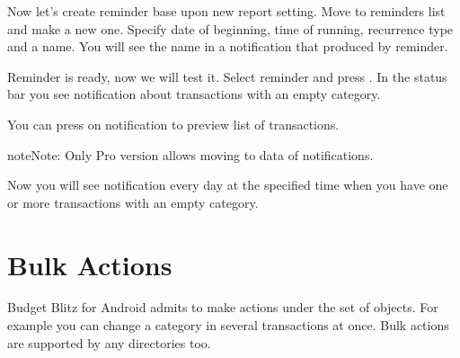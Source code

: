 \documentclass[a4paper,10pt,english]{sphinxmanual}
\begin{document}
\noindent{}

\sphinxAtStartPar
Now let’s create reminder base upon new report setting. Move to reminders list and make a new one.
Specify date of beginning, time of running, recurrence type and a name. You will see the name
in a notification that produced by reminder.

\noindent{}

\noindent{}

\noindent{}

\sphinxAtStartPar
Reminder is ready, now we will test it. Select reminder and press .
In the status bar you see notification about transactions with an empty category.

\noindent{}

\noindent{}

\noindent{}

\sphinxAtStartPar
You can press on notification to preview list of transactions.

\begin{sphinxadmonition}{note}{Note:}
\sphinxAtStartPar
Only Pro version allows moving to data of notifications.
\end{sphinxadmonition}

\sphinxAtStartPar
Now you will see notification every day at the specified time when
you have one or more transactions with an empty category.

\sphinxstepscope


\chapter{Bulk Actions}
\label{\detokenize{bulk-actions:bulk-actions}}\label{\detokenize{bulk-actions:chapter-bulk-actions}}\label{\detokenize{bulk-actions::doc}}
\sphinxAtStartPar
Budget Blitz for Android admits to make actions under the set of objects. For example you can change a category
in several transactions at once. Bulk actions are supported by any directories too.
\end{document}
